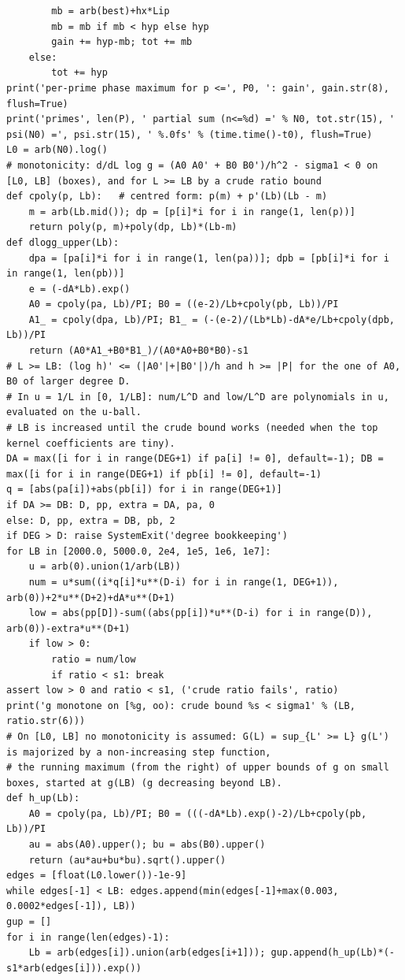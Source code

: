 \documentclass[11pt,reqno]{amsart}
\numberwithin{equation}{section}
\theoremstyle{definition}
\theoremstyle{remark}
\begin{document}
\begin{lstlisting}
        mb = arb(best)+hx*Lip
        mb = mb if mb < hyp else hyp
        gain += hyp-mb; tot += mb
    else:
        tot += hyp
print('per-prime phase maximum for p <=', P0, ': gain', gain.str(8), flush=True)
print('primes', len(P), ' partial sum (n<=%d) =' % N0, tot.str(15), ' psi(N0) =', psi.str(15), ' %.0fs' % (time.time()-t0), flush=True)
L0 = arb(N0).log()
# monotonicity: d/dL log g = (A0 A0' + B0 B0')/h^2 - sigma1 < 0 on [L0, LB] (boxes), and for L >= LB by a crude ratio bound
def cpoly(p, Lb):   # centred form: p(m) + p'(Lb)(Lb - m)
    m = arb(Lb.mid()); dp = [p[i]*i for i in range(1, len(p))]
    return poly(p, m)+poly(dp, Lb)*(Lb-m)
def dlogg_upper(Lb):
    dpa = [pa[i]*i for i in range(1, len(pa))]; dpb = [pb[i]*i for i in range(1, len(pb))]
    e = (-dA*Lb).exp()
    A0 = cpoly(pa, Lb)/PI; B0 = ((e-2)/Lb+cpoly(pb, Lb))/PI
    A1_ = cpoly(dpa, Lb)/PI; B1_ = (-(e-2)/(Lb*Lb)-dA*e/Lb+cpoly(dpb, Lb))/PI
    return (A0*A1_+B0*B1_)/(A0*A0+B0*B0)-s1
# L >= LB: (log h)' <= (|A0'|+|B0'|)/h and h >= |P| for the one of A0, B0 of larger degree D.
# In u = 1/L in [0, 1/LB]: num/L^D and low/L^D are polynomials in u, evaluated on the u-ball.
# LB is increased until the crude bound works (needed when the top kernel coefficients are tiny).
DA = max([i for i in range(DEG+1) if pa[i] != 0], default=-1); DB = max([i for i in range(DEG+1) if pb[i] != 0], default=-1)
q = [abs(pa[i])+abs(pb[i]) for i in range(DEG+1)]
if DA >= DB: D, pp, extra = DA, pa, 0
else: D, pp, extra = DB, pb, 2
if DEG > D: raise SystemExit('degree bookkeeping')
for LB in [2000.0, 5000.0, 2e4, 1e5, 1e6, 1e7]:
    u = arb(0).union(1/arb(LB))
    num = u*sum((i*q[i]*u**(D-i) for i in range(1, DEG+1)), arb(0))+2*u**(D+2)+dA*u**(D+1)
    low = abs(pp[D])-sum((abs(pp[i])*u**(D-i) for i in range(D)), arb(0))-extra*u**(D+1)
    if low > 0:
        ratio = num/low
        if ratio < s1: break
assert low > 0 and ratio < s1, ('crude ratio fails', ratio)
print('g monotone on [%g, oo): crude bound %s < sigma1' % (LB, ratio.str(6)))
# On [L0, LB] no monotonicity is assumed: G(L) = sup_{L' >= L} g(L') is majorized by a non-increasing step function,
# the running maximum (from the right) of upper bounds of g on small boxes, started at g(LB) (g decreasing beyond LB).
def h_up(Lb):
    A0 = cpoly(pa, Lb)/PI; B0 = (((-dA*Lb).exp()-2)/Lb+cpoly(pb, Lb))/PI
    au = abs(A0).upper(); bu = abs(B0).upper()
    return (au*au+bu*bu).sqrt().upper()
edges = [float(L0.lower())-1e-9]
while edges[-1] < LB: edges.append(min(edges[-1]+max(0.003, 0.0002*edges[-1]), LB))
gup = []
for i in range(len(edges)-1):
    Lb = arb(edges[i]).union(arb(edges[i+1])); gup.append(h_up(Lb)*(-s1*arb(edges[i])).exp())

\end{lstlisting}
\end{document}
